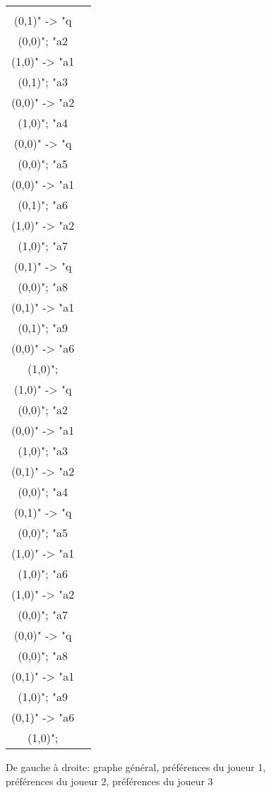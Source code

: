 \documentclass[12pt]{article}
\theoremstyle{defi}
\theoremstyle{not}
\theoremstyle{prob}
\begin{document}
\begin{figure}
\begin{tabular}{cc}
          \begin{tikzpicture}[>=stealth]
          \graph [ layered layout, nodes = {scale=0.75, align=center} ] {
          "a1\\ (0,1)" -> "q\\ (0,0)";
          "a2\\ (1,0)" -> "a1\\ (0,1)";
          "a3\\ (0,0)" -> "a2\\ (1,0)";
          "a4\\ (0,0)" -> "q\\ (0,0)";
          "a5\\ (0,0)" -> "a1\\ (0,1)";
          "a6\\ (1,0)" -> "a2\\ (1,0)";
          "a7\\ (0,1)" -> "q\\ (0,0)";
          "a8\\ (0,1)" -> "a1\\ (0,1)";
          "a9\\ (0,0)" -> "a6\\ (1,0)";
          };
          \end{tikzpicture} &

          \begin{tikzpicture}[>=stealth]
          \graph [ layered layout, nodes = {scale=0.75, align=center} ] {
          "a1\\ (1,0)" -> "q\\ (0,0)";
          "a2\\ (0,0)" -> "a1\\ (1,0)";
          "a3\\ (0,1)" -> "a2\\ (0,0)";
          "a4\\ (0,1)" -> "q\\ (0,0)";
          "a5\\ (1,0)" -> "a1\\ (1,0)";
          "a6\\ (1,0)" -> "a2\\ (0,0)";
          "a7\\ (0,0)" -> "q\\ (0,0)";
          "a8\\ (0,1)" -> "a1\\ (1,0)";
          "a9\\ (0,1)" -> "a6\\ (1,0)";
          };
          \end{tikzpicture} \\
        \end{tabular}

        \caption{De gauche à droite: graphe général, préférences du joueur 1, préférences du joueur 2, préférences du joueur 3}
        \label{fig:non_conv}
      \end{figure}
\end{document}
